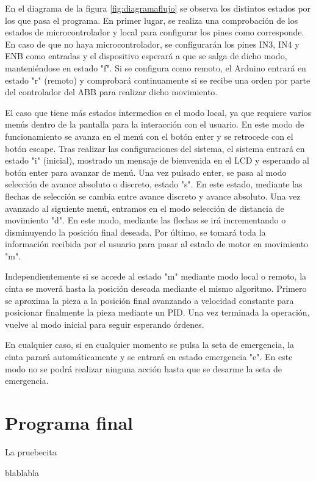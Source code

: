 En el diagrama de la figura \ref{fig:diagramaflujo} se observa los distintos estados por los que pasa el 
programa. En primer lugar, se realiza una comprobación de los estados de microcontrolador y local para 
configurar los pines como corresponde. En caso de que no haya microcontrolador, se configurarán los pines
IN3, IN4 y ENB como entradas y el dispositivo esperará a que se salga de dicho modo, manteniéndose en estado 
"f". Si se configura como remoto, el Arduino entrará en estado "r" (remoto) y comprobará continuamente si se
recibe una orden por parte del controlador del ABB para realizar dicho movimiento.

El caso que tiene más estados intermedios es el modo local, ya que requiere varios menús dentro de la pantalla
para la interacción con el usuario. En este modo de funcionamiento se avanza en el menú con el botón enter y se
retrocede con el botón escape. Tras realizar las configuraciones del sistema, el sistema entrará en estado 
"i" (inicial), mostrado un mensaje de bienvenida en el LCD y esperando al botón enter para avanzar de menú. Una 
vez pulsado enter, se pasa al modo selección de avance absoluto o discreto, estado "s". En este estado, mediante
las flechas de selección se cambia entre avance discreto y avance absoluto. Una vez avanzado al siguiente menú, 
entramos en el modo selección de distancia de movimiento "d". En este modo, mediante las flechas se irá incrementando
o disminuyendo la posición final deseada. Por último, se tomará toda la información recibida por el usuario para 
pasar al estado de motor en movimiento "m".

Independientemente si se accede al estado "m" mediante modo local o remoto, la cinta se moverá hasta la posición 
deseada mediante el mismo algoritmo. Primero se aproxima la pieza a la posición final avanzando a velocidad constante
para posicionar finalmente la pieza mediante un PID. Una vez terminada la operación, vuelve al modo inicial para 
seguir esperando órdenes.

En cualquier caso, si en cualquier momento se pulsa la seta de emergencia, la cinta parará automáticamente y se entrará
en estado emergencia "e". En este modo no se podrá realizar ninguna acción hasta que se desarme la seta de emergencia.

\section{Programa final}

La pruebecita





blablabla

